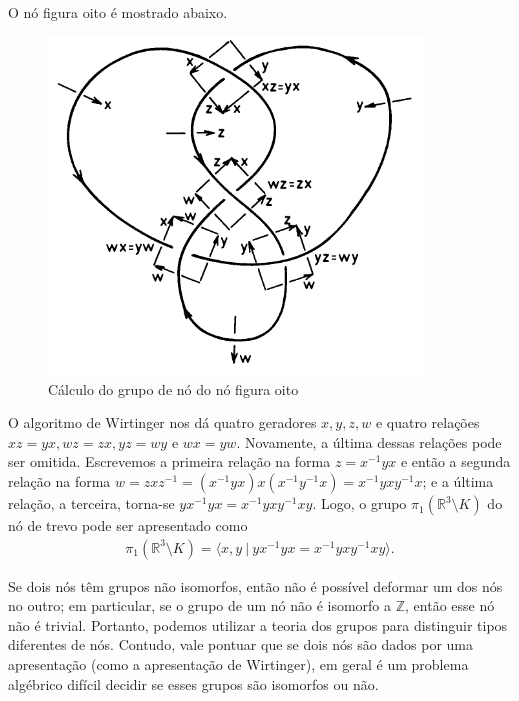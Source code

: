 	\begin{example}
		O nó figura oito é mostrado abaixo.
		\begin{figure}[H]
			\begin{center}
				\includegraphics[width=10cm]{Images/gruponooito.png}
			\end{center}\caption{Cálculo do grupo de nó do nó figura oito}
			\label{grupo no de oito}	
		\end{figure}
		O algoritmo de Wirtinger nos dá quatro geradores $x,y,z,w$ e quatro relações 
		$xz = yx, wz = zx, yz = wy$ e $wx = yw$. Novamente, a última dessas relações 
		pode ser omitida. Escrevemos a primeira relação na forma $z = x^{-1}yx$ e 
		então a segunda relação na forma $w = zxz^{-1} = (x^{-1}yx)x(x^{-1}y^{-1}x) = x^{-1}yxy^{-1}x$; 
		e a última relação, a terceira, torna-se $yx^{-1}yx = x^{-1}yxy^{-1}xy$. 
		Logo, o grupo $\pi_1(\mathbb{R}^3\setminus K)$ do nó de trevo pode ser apresentado como
		\begin{align*}
		    \pi_1(\mathbb{R}^3\setminus K) = \langle x,y \ | \ yx^{-1}yx = x^{-1}yxy^{-1}xy \rangle.
		\end{align*}
	\end{example}
	Se dois nós têm grupos não isomorfos, então não é possível deformar um dos nós no outro; 
	em particular, se o grupo de um nó não é isomorfo a $\mathbb{Z}$, então esse nó não é trivial. 
	Portanto, podemos utilizar a teoria dos grupos para distinguir tipos diferentes de nós. 
	Contudo, vale pontuar que se dois nós são dados por uma apresentação (como a apresentação de Wirtinger), 
	em geral é um problema algébrico difícil decidir se esses grupos são isomorfos ou não.
	
